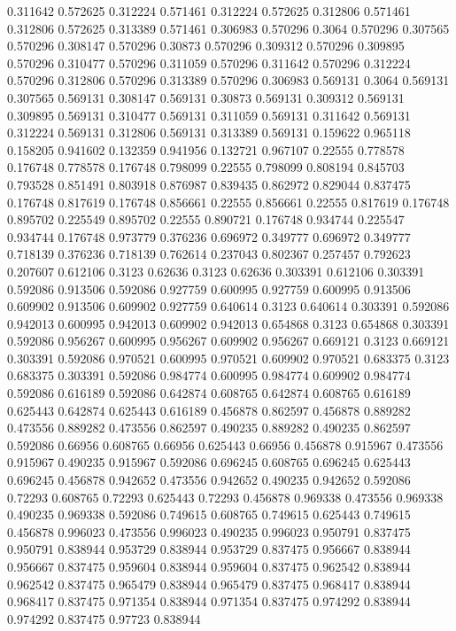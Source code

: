 0.311642 0.572625
0.312224 0.571461
0.312224 0.572625
0.312806 0.571461
0.312806 0.572625
0.313389 0.571461
0.306983 0.570296
0.3064 0.570296
0.307565 0.570296
0.308147 0.570296
0.30873 0.570296
0.309312 0.570296
0.309895 0.570296
0.310477 0.570296
0.311059 0.570296
0.311642 0.570296
0.312224 0.570296
0.312806 0.570296
0.313389 0.570296
0.306983 0.569131
0.3064 0.569131
0.307565 0.569131
0.308147 0.569131
0.30873 0.569131
0.309312 0.569131
0.309895 0.569131
0.310477 0.569131
0.311059 0.569131
0.311642 0.569131
0.312224 0.569131
0.312806 0.569131
0.313389 0.569131
0.159622 0.965118
0.158205 0.941602
0.132359 0.941956
0.132721 0.967107
0.22555 0.778578
0.176748 0.778578
0.176748 0.798099
0.22555 0.798099
0.808194 0.845703
0.793528 0.851491
0.803918 0.876987
0.839435 0.862972
0.829044 0.837475
0.176748 0.817619
0.176748 0.856661
0.22555 0.856661
0.22555 0.817619
0.176748 0.895702
0.225549 0.895702
0.22555 0.890721
0.176748 0.934744
0.225547 0.934744
0.176748 0.973779
0.376236 0.696972
0.349777 0.696972
0.349777 0.718139
0.376236 0.718139
0.762614 0.237043
0.802367 0.257457
0.792623 0.207607
0.612106 0.3123
0.62636 0.3123
0.62636 0.303391
0.612106 0.303391
0.592086 0.913506
0.592086 0.927759
0.600995 0.927759
0.600995 0.913506
0.609902 0.913506
0.609902 0.927759
0.640614 0.3123
0.640614 0.303391
0.592086 0.942013
0.600995 0.942013
0.609902 0.942013
0.654868 0.3123
0.654868 0.303391
0.592086 0.956267
0.600995 0.956267
0.609902 0.956267
0.669121 0.3123
0.669121 0.303391
0.592086 0.970521
0.600995 0.970521
0.609902 0.970521
0.683375 0.3123
0.683375 0.303391
0.592086 0.984774
0.600995 0.984774
0.609902 0.984774
0.592086 0.616189
0.592086 0.642874
0.608765 0.642874
0.608765 0.616189
0.625443 0.642874
0.625443 0.616189
0.456878 0.862597
0.456878 0.889282
0.473556 0.889282
0.473556 0.862597
0.490235 0.889282
0.490235 0.862597
0.592086 0.66956
0.608765 0.66956
0.625443 0.66956
0.456878 0.915967
0.473556 0.915967
0.490235 0.915967
0.592086 0.696245
0.608765 0.696245
0.625443 0.696245
0.456878 0.942652
0.473556 0.942652
0.490235 0.942652
0.592086 0.72293
0.608765 0.72293
0.625443 0.72293
0.456878 0.969338
0.473556 0.969338
0.490235 0.969338
0.592086 0.749615
0.608765 0.749615
0.625443 0.749615
0.456878 0.996023
0.473556 0.996023
0.490235 0.996023
0.950791 0.837475
0.950791 0.838944
0.953729 0.838944
0.953729 0.837475
0.956667 0.838944
0.956667 0.837475
0.959604 0.838944
0.959604 0.837475
0.962542 0.838944
0.962542 0.837475
0.965479 0.838944
0.965479 0.837475
0.968417 0.838944
0.968417 0.837475
0.971354 0.838944
0.971354 0.837475
0.974292 0.838944
0.974292 0.837475
0.97723 0.838944
